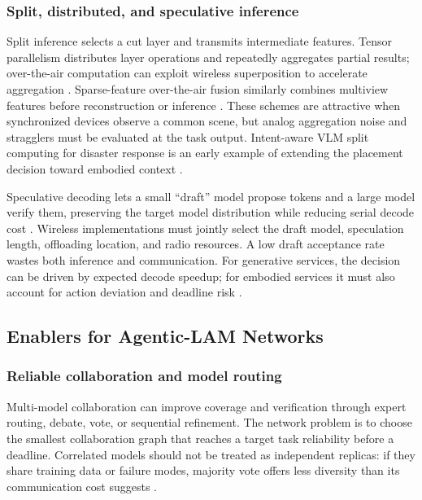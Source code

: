 \documentclass[letterpaper,journal]{IEEEtran}
\begin{document}
\subsubsection{Split, distributed, and speculative inference}
Split inference selects a cut layer and transmits intermediate features.
Tensor parallelism distributes layer operations and repeatedly aggregates
partial results; over-the-air computation can exploit wireless superposition
to accelerate aggregation \cite{distributedllm,aircompneural}. Sparse-feature
over-the-air fusion similarly combines multiview features before
reconstruction or inference \cite{airfusion}. These schemes are attractive
when synchronized devices observe a common scene, but analog aggregation
noise and stragglers must be evaluated at the task output. Intent-aware VLM
split computing for disaster response is an early example of extending the
placement decision toward embodied context \cite{avery}.

Speculative decoding lets a small ``draft'' model propose tokens and a large
model verify them, preserving the target model distribution while reducing
serial decode cost \cite{specdecode}. Wireless implementations must jointly
select the draft model, speculation length, offloading location, and radio
resources. A low draft acceptance rate wastes both inference and
communication. For generative services, the decision can be driven by
expected decode speedup; for embodied services it must also account for action
deviation and deadline risk \cite{actiondeviation}.

\subsection{Enablers for Agentic-LAM Networks}
\subsubsection{Reliable collaboration and model routing}
Multi-model collaboration can improve coverage and verification through
expert routing, debate, vote, or sequential refinement. The network problem
is to choose the smallest collaboration graph that reaches a target task
reliability before a deadline. Correlated models should not be treated as
independent replicas: if they share training data or failure modes, majority
vote offers less diversity than its communication cost suggests
\cite{du_debate,estornell}.
\end{document}
